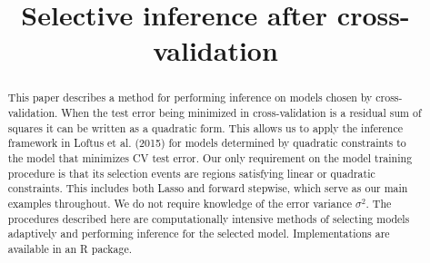 \documentclass[preprint]{imsart}
\begin{document}
\begin{frontmatter}

\title{Selective inference after cross-validation}

\author{ \corref{}}%
\address{}
\address{Department of Statistics\\Sequoia Hall\\390 Serra Mall\\Stanford, CA}



\begin{abstract}
This paper describes a method for performing inference on models chosen by cross-validation. When the test error being minimized in cross-validation is a residual sum of squares it can be written as a quadratic form. This allows us to apply the inference framework in Loftus et al. (2015) for models determined by quadratic constraints to the model that minimizes CV test error. Our only requirement on the model training procedure is that its selection events are regions satisfying linear or quadratic constraints. This includes both Lasso and forward stepwise, which serve as our main examples throughout. We do not require knowledge of the error variance $\sigma^2$. The procedures described here are computationally intensive methods of selecting models adaptively and performing inference for the selected model. Implementations are available in an R package.
\end{abstract}



\end{frontmatter}
\end{document}

